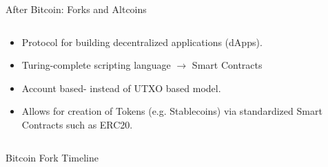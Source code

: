 \documentclass[]{beamer}
\begin{document}
\begin{frame}{After Bitcoin: Forks and Altcoins}
\begin{columns}
		\vspace{0.5em}
		\begin{small}
			\begin{itemize}
				\item Protocol for building decentralized applications (dApps).
				\item Turing-complete scripting language $\rightarrow$ Smart Contracts
				\item Account based- instead of UTXO based model.
				\item Allows for creation of Tokens (e.g. Stablecoins) via standardized Smart Contracts such as ERC20.
			\end{itemize}
		\end{small}
	\end{columns}	
\end{frame}


\begin{frame}{Bitcoin Fork Timeline}
	\begin{figure}[h!]
	\center
		\begin{tikzpicture}[scale=0.65, every node/.style={scale=0.65}]
			
  		\end{tikzpicture}
		\label{fig:forkhistory}
	\end{figure}
\end{frame}



%	
		
\end{document}
